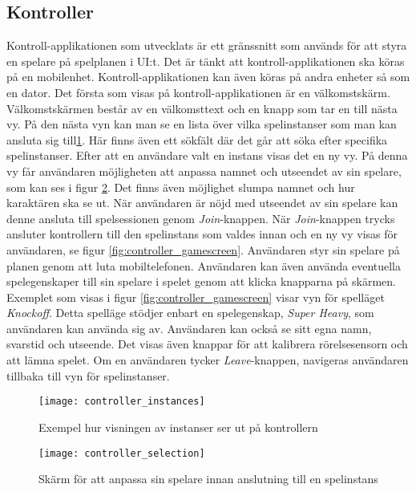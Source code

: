 \subsection{Kontroller}
Kontroll-applikationen som utvecklats är ett gränssnitt som används för att styra en spelare på spelplanen i UI:t. Det är tänkt att kontroll-applikationen ska köras på en mobilenhet. Kontroll-applikationen kan även köras på andra enheter så som en dator. Det första som visas på kontroll-applikationen är en välkomstskärm. Välkomstskärmen består av en välkomsttext och en knapp som tar en till nästa vy. På den nästa vyn kan man se en lista över vilka spelinstanser som man kan ansluta sig till\ref{fig:controller_instances}. Här finns även ett sökfält där det går att söka efter specifika spelinstanser. Efter att en användare valt en instans visas det en ny vy. På denna vy får användaren möjligheten att anpassa namnet och utseendet av sin spelare, som kan ses i figur \ref{fig:controller_selection}. Det finns även möjlighet slumpa namnet och hur karaktären ska se ut. När användaren är nöjd med utseendet av sin spelare kan denne ansluta till spelsessionen genom \textit{Join}-knappen. När \textit{Join}-knappen trycks ansluter kontrollern till den spelinstans som valdes innan och en ny vy visas för användaren, se figur \ref{fig:controller_gamescreen}. Användaren styr sin spelare på planen genom att luta mobiltelefonen. Användaren kan även använda eventuella spelegenskaper till sin spelare i spelet genom att klicka knapparna på skärmen. Exemplet som visas i figur \ref{fig:controller_gamescreen} visar vyn för spelläget \textit{Knockoff}. Detta spelläge stödjer enbart en spelegenskap, \textit{Super Heavy}, som användaren kan använda sig av. Användaren kan också se sitt egna namn, svarstid och utseende. Det visas även knappar för att kalibrera rörelsesensorn och att lämna spelet. Om en användaren tycker \textit{Leave}-knappen, navigeras användaren tillbaka till vyn för spelinstanser.

\begin{figure}[h]
    \centering
    \texttt{[image: controller\_instances]}
    \caption{Exempel hur visningen av instanser ser ut på kontrollern}
    \label{fig:controller_instances}
\end{figure}

\begin{figure}[h]
    \centering
    \texttt{[image: controller\_selection]}
    \caption{Skärm för att anpassa sin spelare innan anslutning till en spelinstans}
    \label{fig:controller_selection}
\end{figure}

